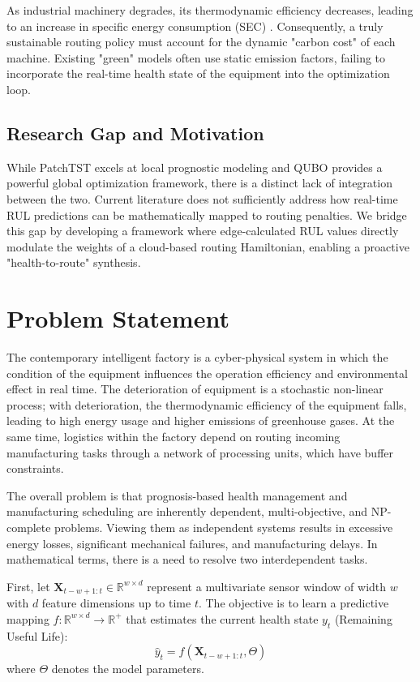 \documentclass[conference]{IEEEtran}
\begin{document}
As industrial machinery degrades, its thermodynamic efficiency decreases, leading to an increase in specific energy consumption (SEC) \cite{ref5}. Consequently, a truly sustainable routing policy must account for the dynamic "carbon cost" of each machine. Existing "green" models often use static emission factors, failing to incorporate the real-time health state of the equipment into the optimization loop.

\subsection{Research Gap and Motivation}
While PatchTST excels at local prognostic modeling and QUBO provides a powerful global optimization framework, there is a distinct lack of integration between the two. Current literature does not sufficiently address how real-time RUL predictions can be mathematically mapped to routing penalties. We bridge this gap by developing a framework where edge-calculated RUL values directly modulate the weights of a cloud-based routing Hamiltonian, enabling a proactive "health-to-route" synthesis.

\section{Problem Statement}
The contemporary intelligent factory is a cyber-physical system in which the condition of the equipment influences the operation efficiency and environmental effect in real time. The deterioration of equipment is a stochastic non-linear process; with deterioration, the thermodynamic efficiency of the equipment falls, leading to high energy usage and higher emissions of greenhouse gases. At the same time, logistics within the factory depend on routing incoming manufacturing tasks through a network of processing units, which have buffer constraints.

The overall problem is that prognosis-based health management and manufacturing scheduling are inherently dependent, multi-objective, and NP-complete problems. Viewing them as independent systems results in excessive energy losses, significant mechanical failures, and manufacturing delays. In mathematical terms, there is a need to resolve two interdependent tasks.

First, let $\mathbf{X}_{t-w+1:t} \in \mathbb{R}^{w \times d}$ represent a multivariate sensor window of width $w$ with $d$ feature dimensions up to time $t$. The objective is to learn a predictive mapping $f: \mathbb{R}^{w \times d} \to \mathbb{R}^+$ that estimates the current health state $y_t$ (Remaining Useful Life):
\begin{equation}
  \hat{y}_t = f(\mathbf{X}_{t-w+1:t}, \Theta)
  \label{eq:rul_mapping}
\end{equation}
where $\Theta$ denotes the model parameters.
\end{document}
